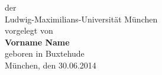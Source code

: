 \documentclass[11pt]{article}
\begin{document}
\begin{titlepage}
\begin{center}
            \hspace*{-0.73cm}
            \hspace*{-0.5cm}der\\
            \vspace*{0.1cm}
            \hspace*{-0.73cm}
            \hspace*{-0.5cm}Ludwig-Maximilians-Universit\"at M\"unchen\\
            \vspace*{3.5cm}
            \large
            \hspace*{-0.73cm}
            \hspace*{-0.8cm} vorgelegt von\\
            \vspace*{0.1cm}
            \hspace*{-0.73cm}
            \hspace*{-0.7cm}\Large \textbf{Vorname Name}\\
            \vspace*{0.15cm}
            \large
            \hspace*{-0.73cm}
            \hspace*{-0.8cm} geboren in Buxtehude\\
            \vspace*{2.5cm}
            \vspace*{0.4cm}
            \hspace*{-0.73cm}
            \hspace*{-0.43cm}M\"unchen, den 30.06.2014\\
        \end{center}
    \end{titlepage}
\end{document}

